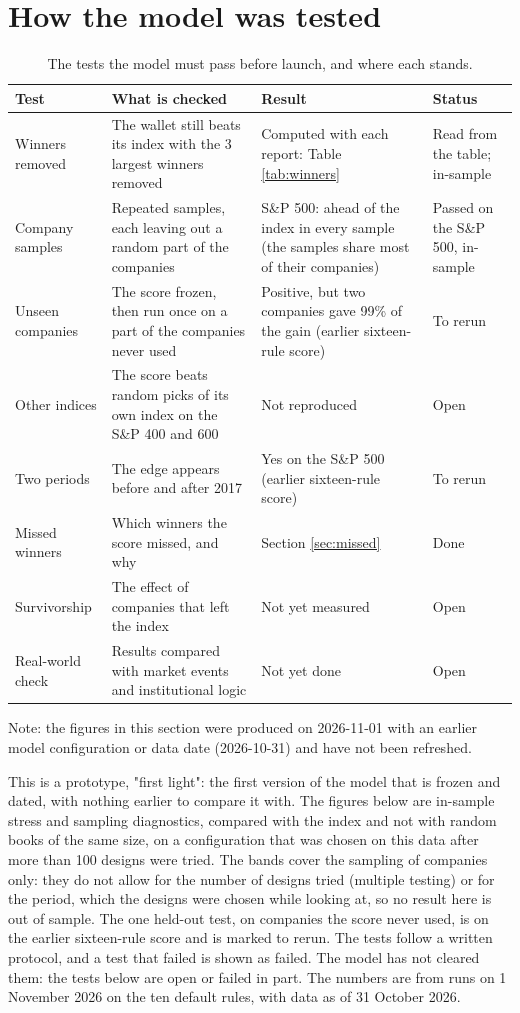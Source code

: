 \documentclass[11pt,a4paper]{article}
\begin{document}
\section{How the model was tested}
\label{sec:testing}
\begin{table}[H]
\centering
\small
\caption{The tests the model must pass before launch, and where each stands.}\label{tab:testing}
\begin{tabular}{l p{3.6cm} p{4.6cm} p{2.3cm}}
\hline
Test & What is checked & Result & Status \\
\hline
Winners removed & The wallet still beats its index with the 3 largest winners removed & Computed with each report: Table \ref{tab:winners} & Read from the table; in-sample \\
Company samples & Repeated samples, each leaving out a random part of the companies & S\&P 500: ahead of the index in every sample (the samples share most of their companies) & Passed on the S\&P 500, in-sample \\
Unseen companies & The score frozen, then run once on a part of the companies never used & Positive, but two companies gave 99\% of the gain (earlier sixteen-rule score) & To rerun \\
Other indices & The score beats random picks of its own index on the S\&P 400 and 600 & Not reproduced & Open \\
Two periods & The edge appears before and after 2017 & Yes on the S\&P 500 (earlier sixteen-rule score) & To rerun \\
Missed winners & Which winners the score missed, and why & Section \ref{sec:missed} & Done \\
Survivorship & The effect of companies that left the index & Not yet measured & Open \\
Real-world check & Results compared with market events and institutional logic & Not yet done & Open \\
\hline
\end{tabular}
\end{table}
Note: the figures in this section were produced on 2026-11-01 with an earlier model configuration or data date (2026-10-31) and have not been refreshed.

This is a prototype, "first light": the first version of the model that is frozen and dated, with nothing earlier to compare it with. The figures below are in-sample stress and sampling diagnostics, compared with the index and not with random books of the same size, on a configuration that was chosen on this data after more than 100 designs were tried. The bands cover the sampling of companies only: they do not allow for the number of designs tried (multiple testing) or for the period, which the designs were chosen while looking at, so no result here is out of sample. The one held-out test, on companies the score never used, is on the earlier sixteen-rule score and is marked to rerun. The tests follow a written protocol, and a test that failed is shown as failed. The model has not cleared them: the tests below are open or failed in part. The numbers are from runs on 1 November 2026 on the ten default rules, with data as of 31 October 2026.
\end{document}
